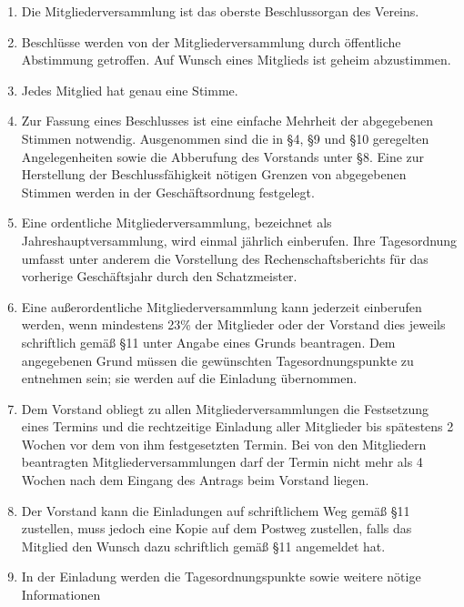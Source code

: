 ﻿\documentclass[10pt,a4paper]{scrartcl}
\begin{document}
\begin{enumerate}

        \item Die Mitgliederversammlung ist das oberste Beschlussorgan des Vereins.
        \item Beschlüsse werden von der Mitgliederversammlung durch öffentliche Abstimmung getroffen.
                Auf Wunsch eines Mitglieds ist geheim abzustimmen.
        \item Jedes Mitglied hat genau eine Stimme.
		\item Zur Fassung eines Beschlusses ist eine einfache Mehrheit der abgegebenen Stimmen
             notwendig. Ausgenommen sind die in §4, §9 und §10 geregelten Angelegenheiten sowie die Abberufung des Vorstands unter §8. Eine
             zur Herstellung der Beschlussfähigkeit nötigen Grenzen von abgegebenen Stimmen
             werden in der Geschäftsordnung festgelegt.
        \item Eine ordentliche Mitgliederversammlung, bezeichnet als Jahreshauptversammlung,
                wird einmal jährlich einberufen. Ihre Tagesordnung umfasst unter anderem die
                Vorstellung des Rechenschaftsberichts für das vorherige Geschäftsjahr durch
                den Schatzmeister.
        \item Eine außerordentliche Mitgliederversammlung kann jederzeit einberufen werden, wenn
                mindestens 23\% der Mitglieder oder der Vorstand dies jeweils schriftlich gemäß §11
                unter Angabe eines Grunds beantragen. Dem angegebenen Grund müssen die gewünschten
                Tagesordnungspunkte zu entnehmen sein; sie werden auf die Einladung übernommen.
        \item Dem Vorstand obliegt zu allen Mitgliederversammlungen die Festsetzung eines Termins
                und die rechtzeitige Einladung aller Mitglieder bis spätestens 2 Wochen vor dem
                von ihm festgesetzten Termin. Bei von den Mitgliedern beantragten
                Mitgliederversammlungen darf der Termin nicht mehr als 4 Wochen nach dem Eingang
                des Antrags beim Vorstand liegen.
        \item Der Vorstand kann die Einladungen auf schriftlichem Weg gemäß §11 zustellen, muss
                jedoch eine Kopie auf dem Postweg zustellen, falls das Mitglied den Wunsch dazu
                schriftlich gemäß §11 angemeldet hat.
        \item In der Einladung werden die Tagesordnungspunkte sowie weitere nötige Informationen

\end{enumerate}
\end{document}
